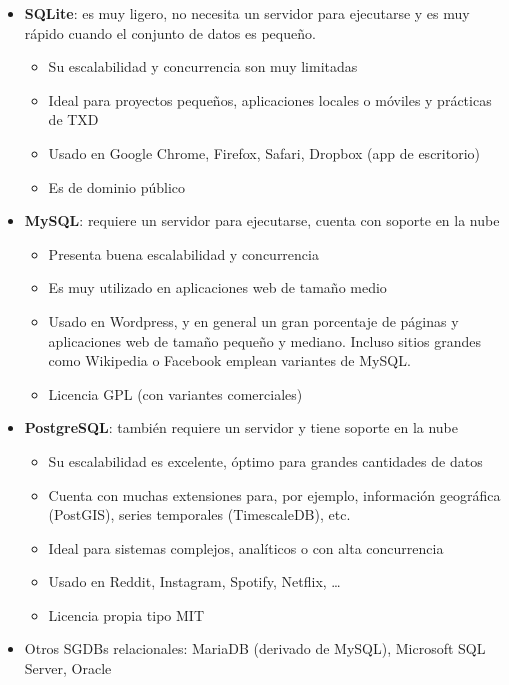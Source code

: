 \documentclass[
]{book}
\providecommand{\tightlist}{%
  \setlength{\itemsep}{0pt}\setlength{\parskip}{0pt}}
\theoremstyle{break}
\theoremstyle{nonumberplain}
\begin{document}
\begin{itemize}
\tightlist
\item
  \textbf{SQLite}: es muy ligero, no necesita un servidor para ejecutarse y es muy rápido cuando el conjunto de datos es pequeño.

  \begin{itemize}
  \tightlist
  \item
    Su escalabilidad y concurrencia son muy limitadas
  \item
    Ideal para proyectos pequeños, aplicaciones locales o móviles y prácticas de TXD
  \item
    Usado en Google Chrome, Firefox, Safari, Dropbox (app de escritorio)
  \item
    Es de dominio público
  \end{itemize}
\item
  \textbf{MySQL}: requiere un servidor para ejecutarse, cuenta con soporte en la nube

  \begin{itemize}
  \tightlist
  \item
    Presenta buena escalabilidad y concurrencia
  \item
    Es muy utilizado en aplicaciones web de tamaño medio
  \item
    Usado en Wordpress, y en general un gran porcentaje de páginas y aplicaciones web de tamaño pequeño y mediano. Incluso sitios grandes como Wikipedia o Facebook emplean variantes de MySQL.
  \item
    Licencia GPL (con variantes comerciales)
  \end{itemize}
\item
  \textbf{PostgreSQL}: también requiere un servidor y tiene soporte en la nube

  \begin{itemize}
  \tightlist
  \item
    Su escalabilidad es excelente, óptimo para grandes cantidades de datos
  \item
    Cuenta con muchas extensiones para, por ejemplo, información geográfica (PostGIS), series temporales (TimescaleDB), etc.
  \item
    Ideal para sistemas complejos, analíticos o con alta concurrencia
  \item
    Usado en Reddit, Instagram, Spotify, Netflix, \ldots{}
  \item
    Licencia propia tipo MIT
  \end{itemize}
\item
  Otros SGDBs relacionales: MariaDB (derivado de MySQL), Microsoft SQL Server, Oracle
\end{itemize}
\end{document}
